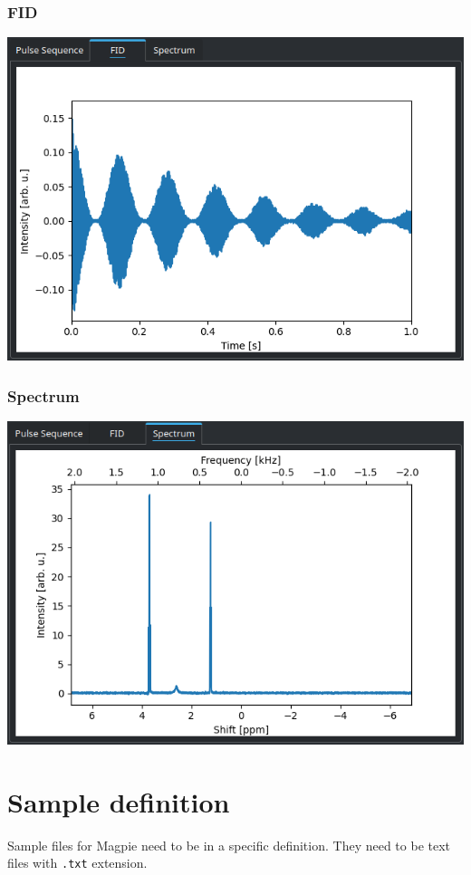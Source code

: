 \documentclass[11pt,a4paper]{article}
\begin{document}
\subsubsection{FID}
\begin{center}
\includegraphics[width=0.9\linewidth]{images/Plot_FID.png}
\end{center}

\subsubsection{Spectrum}
\begin{center}
\includegraphics[width=0.9\linewidth]{images/Plot_Spectrum.png}
\end{center}


\section{Sample definition}\label{sec:sample}
Sample files for Magpie need to be in a specific definition. They need to be text files with \texttt{.txt} extension.
\end{document}
